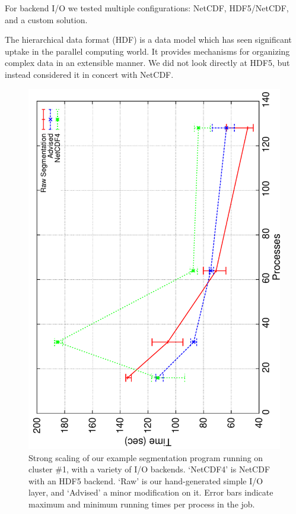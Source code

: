 
For backend I/O we tested multiple configurations: NetCDF, HDF5/NetCDF,
and a custom solution.

The hierarchical data format (HDF) is a data model which has seen
significant uptake in the parallel computing world.  It provides
mechanisms for organizing complex data in an extensible manner.  We did
not look directly at HDF5, but instead considered it in concert with
NetCDF.

\begin{figure}
  \centering
  \includegraphics[angle=270,width=\linewidth]{images/io/lens-most}
  \caption{Strong scaling of our example segmentation program running
  on cluster \#1, with a variety of I/O backends.  `NetCDF4' is NetCDF
  with an HDF5 backend.  `Raw' is our hand-generated simple I/O layer,
  and `Advised' a minor modification on it.  Error bars indicate
  maximum and minimum running times per process in the job.}
  \label{fig:lens-most}
\end{figure}

